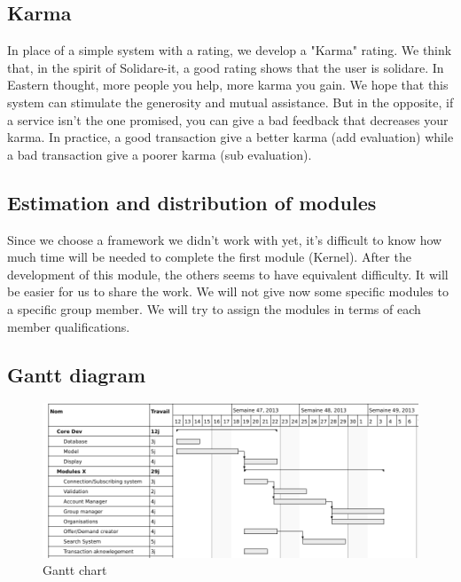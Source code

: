 \subsection{Karma}
In place of a simple system with a rating, we develop a "Karma" rating.  We think that, in the spirit of Solidare-it, a good rating shows that the user is solidare.  In Eastern thought,  more people you help, more karma you gain. We hope that this system can stimulate the generosity and mutual assistance. But in the opposite, if a service isn't the one promised, you can give a bad feedback that decreases your karma.
In practice, a good transaction give a better karma (add evaluation) while a bad transaction give a poorer karma (sub evaluation).

\subsection{Estimation and distribution of modules}
Since we choose a framework we didn't work with yet, it's difficult to know how much time will be needed to complete the first module (Kernel). After the development of this module, the others seems to have equivalent difficulty. It will be easier for us to share the work. We will not give now some specific modules to a specific group member. We will try to assign the modules in terms of each member qualifications.

\subsection{Gantt diagram}
\begin{figure}[!ht]
	\begin{center}
		\includegraphics[width=\textwidth]{gantt_2_22_2_76.pdf}
		\caption{Gantt chart}
		\label{fig:gantt}
	\end{center}
\end{figure}


